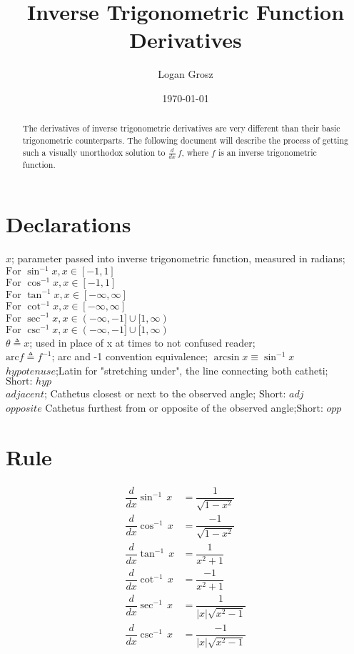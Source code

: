 \documentclass{article}
\begin{document}
	
\author{Logan Grosz}
\title{Inverse Trigonometric Function Derivatives}
\date{\today}

\maketitle

\begin{abstract}
	\noindent The derivatives of inverse trigonometric derivatives are very different than their basic trigonometric counterparts. The following document will describe the process of getting such a visually unorthodox solution to $\frac{d}{dx}\,f$, where $f$ is an inverse trigonometric function.
\end{abstract}

\section{Declarations}
	$x$; parameter passed into inverse trigonometric function, measured in radians;\\
	\indent$\text{For} \,\,\sin^{-1} x, x \in [-1,1]$\\
	\indent$\text{For} \,\,\cos^{-1} x, x \in [-1,1]$\\
	\indent$\text{For} \,\,\tan^{-1} x, x \in [-\infty,\infty]$\\
	\indent$\text{For} \,\,\cot^{-1} x, x \in [-\infty,\infty]$\\
	\indent$\text{For} \,\,\sec^{-1} x, x \in (-\infty,-1]\cup[1,\infty)$\\
	\indent$\text{For} \,\,\csc^{-1} x, x \in (-\infty,-1]\cup[1,\infty)$\\
	$\theta \triangleq x$; used in place of x at times to not confused reader;\\
	$\text{arc}f \triangleq f^{-1}$; arc and -1 convention equivalence; $\arcsin x \equiv \sin^{-1}x$\\
	$hypotenuse$;Latin for "stretching under", the line connecting both catheti; $\text{Short: }hyp$\\
	$adjacent$; Cathetus closest or next to the observed angle; $\text{Short: }adj$\\
	$opposite$ Cathetus furthest from or opposite of the observed angle;$\text{Short: }opp$
\section{Rule}

\begin{align}
	\dfrac{d}{dx}\sin^{-1}\,x&=\dfrac{1}{\sqrt{1 - x^2}}\\[1em]
	\dfrac{d}{dx}\cos^{-1}\,x&=\dfrac{-1}{\sqrt{1 - x^2}}\\[1em]
	\dfrac{d}{dx}\tan^{-1}\,x&=\dfrac{1}{x^2+1}\\[1em]
	\dfrac{d}{dx}\cot^{-1}\,x&=\dfrac{-1}{x^2+1}\\[1em]
	\dfrac{d}{dx}\sec^{-1}\,x&=\dfrac{1}{|x|\sqrt{x^2-1}}\\[1em]
	\dfrac{d}{dx}\csc^{-1}\,x&=\dfrac{-1}{|x|\sqrt{x^2-1}}
\end{align}
\end{document}
